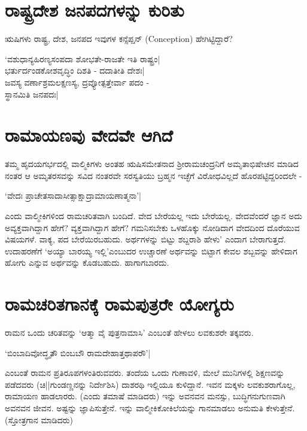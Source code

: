 \section*{ರಾಷ್ಟ್ರದೇಶ ಜನಪದಗಳನ್ನು ಕುರಿತು}

ಋಷಿಗಳು ರಾಷ್ಟ್ರ, ದೇಶ, ಜನಪದ ಇವುಗಳ ಕನ್ಸೆಪ್ಷನ್ ({\eng Conception}) ಹೇಗಿಟ್ಟಿದ್ದಾರೆ?

\begin{shloka}
`ವಶುಧಾನ್ಯಹಿರಣ್ಯಸಂಪದಾ ಶೋಭತೇ-ರಾಜತೇ ಇತಿ ರಾಷ್ಟ್ರಂ|\label{227}\\
ಭರ್ತುರ್ದಂಡಕೋಶವೃದ್ಧಿಂ ದಿಶತಿ - ದದಾತೀತಿ ದೇಶಃ|\\
ಜವಸ್ಯ ವರ್ಣಾಶ್ರಮಲಕ್ಷಣಸ್ಯ, ದ್ರವ್ಯೋತ್ಪತ್ತೇರ್ವಾ ಪದಂ -\\
ಸ್ಥಾನಮಿತಿ ಜನಪದಃ|
\end{shloka}

\section*{ರಾಮಾಯಣವು ವೇದವೇ ಆಗಿದೆ}

ತಮ್ಮ ಹೃದಯಗರ್ಭದಲ್ಲಿ ವಾಲ್ಮಿಕಿಗಳು ಅಂತಹ ಋಷಿಸಮೇತನಾದ ಶ್ರೀರಾಮಚಂದ್ರನಿಗೆ ಅಮೃತಾಭಿಷೇಚನ ಮಾಡಿದ ನಂತರ ಆ ಅಮೃತರಸವನ್ನು ಸವಿದ ನಂತರವೇ ಸರಸ್ವತಿಯು ಬ್ರಹ್ಮನ ಇಚ್ಛೆಗೆ ವಿರೋಧವಿಲ್ಲದೆ ಹೊರಪಟ್ಟಿದ್ದರಿಂದಲೇ -

\begin{shloka}
`ವೇದಃ ಪ್ರಾಚೇತಸಾದಾಸೀತ್ಸಾಕ್ಷಾದ್ರಾಮಾಯಣಾತ್ಮನಾ'|
\end{shloka}
ಎಂದು ವಾಲ್ಮೀಕಿಗಳಿಂದ ರಾಮಚರಿತವಾಗಿ ಬಂದಿದೆ. ವೇದ ಬೇರೆಯಲ್ಲ ಇದು ಬೇರೆಯಲ್ಲ. ವೇದವೆಂದರೆ ಜ್ಞಾನ ಅದು ಅವ್ಯಕ್ತವಾಗಿದ್ದಾಗ ಹೇಗೆ? ವ್ಯಕ್ತವಾಗಿದ್ದಾಗ ಹೇಗೆ? ಗಮನಿಸಬೇಕು ಒಳಹೊಕ್ಕು ನೋಡಿದಾಗ ವೇದದಿಂದ ದೊರೆಯುವ ವಿಷಯಗಳೆ. ವಾಕ್ಯ, ಪದ ಬೇರೆಯಿರಬಹುದು. ಅರ್ಥಗಳನ್ನು ಬಿಟ್ಟು ಶಬ್ದರಾಶಿ ಹೇಳು' ಎಂದಾಗ ಬೇರಾಗುತ್ತದೆ. ಉದಾಹರಣೆಗೆ `ಅಯ್ಯಾ ಬಾರಯ್ಯ ಇಲ್ಲಿ'ಎಂಬುದರ ಉಚ್ಚಾರಣೆ ಅರ್ಥವನ್ನು ಬಿಟ್ಟಾಗ ಕೇವಲ ಶಬ್ಬವನ್ನು ಹೇಳಿದಾಗ ಹೋಗು ಎನ್ನುವ ಅರ್ಥವನ್ನು ಕೊಡಬಹುದು. ಹಾಗಾಗಬಾರದು.

\section*{ರಾಮಚರಿತಗಾನಕ್ಕೆ ರಾಮಪುತ್ರರೇ ಯೋಗ್ಯರು}

ರಾಮನ ಒಂದು ಚರಿತವನ್ನು `ಆತ್ಮಾ ವೈ ಪುತ್ರನಾಮಾಸಿ'\label{228} ಎಂಬಂತೆ ಹೇಳಲು ಲವಕುಶರೇ ತಕ್ಕವರು.

\begin{shloka}
`ಬಿಂಬಾದಿವೋದ್ಧೃತೌ ಬಿಂಬಬೌ ರಾಮದೇಹಾತ್ತಥಾಪರೌ'|
\end{shloka}
ಎಂಬಂತೆ ರಾಮನ ಪ್ರತಿರೂಪಗಳಂತಿರುವವರು. ತಂದೆಯ ಒಂದು ಗುಣಾವಳಿ, ಮೇಲೆ ಮುನಿಗಳಲ್ಲಿ ಶಿಕ್ಷಣವನ್ನು ಪಡೆದವರು (ಚಿ||ಗುಂಡಣ್ಣನನ್ನು ನಿರ್ದೇಶಿಸಿ) ದಾಶರಥಿ ಇಲ್ಲಿಯೂ ಕುಳಿದ್ದಾನೆ. ಇವನ ಮಕ್ಕಳು ಲವಕುಶರಾಗೊಲ್ಲ, ರಾಮಾಯಣ ಹಾಡಲಾರರು. (ಎಂದು ತಮಾಷೆ ಮಾಡಿದರು) ಇನ್ನು ಅವನವನ ಮನಸ್ಸು, ಬುದ್ಧಿಗನುಗುಣವಾಗಿ ಅವನವನ ಜೀವನ. ಅಷ್ಟನ್ನು ಜ್ಞಾಪಿಸುತ್ತೇನೆ. ಇನ್ನು ವಾಲ್ಮೀಕಿಕೋಕಿಲೆಯನ್ನು ಗಾನಮಾಡಲು ಅನುಮತಿ ಕೇಳುತ್ತೇನೆ. (ಸ್ತೋತ್ರಗಾನ ಮಾಡಿದರು)

